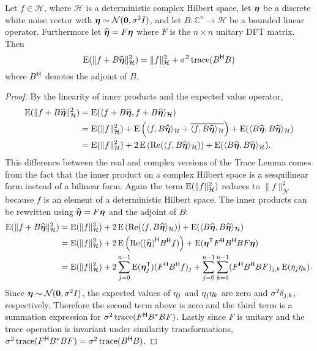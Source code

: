 \begin{lemma}
Let $f \in \mathcal{H}$, where $\mathcal{H}$ is a deterministic complex Hilbert space, let $\boldsymbol{\eta}$ be a discrete white noise vector with $\boldsymbol{\eta} \sim \mathcal{N}(\mathbf{0},\sigma^2{I})$, and let $B: \mathbb{C}^n \rightarrow  \mathcal{H}$ be a bounded linear operator. Furthermore let $\widehat{\boldsymbol{\eta}} = F\boldsymbol{\eta}$ where $F$ is the $n \times n$ unitary DFT matrix. Then
\[\operatorname{E}(\|f + B\widehat{\boldsymbol{\eta}}\|_{\mathcal{H}}^2) = \|f\|_{\mathcal{H}}^2 + \sigma^2\operatorname{trace}({B}^\mathsf{H}{B})\]
where ${B}^\mathsf{H}$ denotes the adjoint of $B$.
\end{lemma}
\begin{proof}
By the linearity of inner products and the expected value operator,
\begin{align*}
\operatorname{E}(\|f + B\widehat{\boldsymbol{\eta}}\|_{\mathcal{H}}^2) &= \operatorname{E}(\langle f + B\widehat{\boldsymbol{\eta}}, f + B\widehat{\boldsymbol{\eta}}\rangle_{\mathcal{H}}) \\
&= \operatorname{E}(\|f\|_{\mathcal{H}}^2) + \operatorname{E}\left(\langle f, B\widehat{\boldsymbol{\eta}}\rangle_{\mathcal{H}} + \overline{\langle f, B\widehat{\boldsymbol{\eta}}\rangle_{\mathcal{H}}}\right) + \operatorname{E}(\langle B\widehat{\boldsymbol{\eta}}, B\widehat{\boldsymbol{\eta}}\rangle_{\mathcal{H}}) \\
&= \operatorname{E}(\|f\|_{\mathcal{H}}^2) + 2\operatorname{E}\left(\operatorname{Re}(\langle f, B\widehat{\boldsymbol{\eta}}\rangle_{\mathcal{H}})\right) + \operatorname{E}(\langle B\widehat{\boldsymbol{\eta}}, B\widehat{\boldsymbol{\eta}}\rangle_{\mathcal{H}}).
\end{align*}
This difference between the real and complex versions of the Trace Lemma comes from the fact that the inner product on a complex Hilbert space is a sesquilinear form instead of a bilinear form. Again the term $\operatorname{E}(\|f\|_{\mathcal{H}}^2)$ reduces to $\|f\|_{\mathcal{H}}^2$ because $f$ is an element of a deterministic Hilbert space. The inner products can be rewritten using $\widehat{\boldsymbol{\eta}} = F\boldsymbol{\eta}$ and the adjoint of $B$:
\begin{align*}
\operatorname{E}(\|f + B\widehat{\boldsymbol{\eta}}\|_{\mathcal{H}}^2) &= \operatorname{E}(\|f\|_{\mathcal{H}}^2) + 2\operatorname{E}\left(\operatorname{Re}(\langle f, B\widehat{\boldsymbol{\eta}}\rangle_{\mathcal{H}})\right) + \operatorname{E}(\langle B\widehat{\boldsymbol{\eta}}, B\widehat{\boldsymbol{\eta}}\rangle_{\mathcal{H}}) \\
&= \operatorname{E}(\|f\|_{\mathcal{H}}^2) + 2\operatorname{E}\left(\operatorname{Re}({(\widehat{\boldsymbol{\eta}})}^\mathsf{H}{{B}^\mathsf{H}}f)\right) + \operatorname{E}({\boldsymbol{\eta}}^\mathsf{T}{{F}^\mathsf{H}}{{B}^\mathsf{H}}BF\boldsymbol{\eta}) \\
&= \operatorname{E}(\|f\|_{\mathcal{H}}^2) + 2\sum_{j=0}^{n-1} \operatorname{E}({\boldsymbol{\eta}}^\mathsf{T}_j)({F}^\mathsf{H}{{B}^\mathsf{H}}f)_j + \sum_{j=0}^{n-1}\sum_{k=0}^{n-1} ({{F}^\mathsf{H}}{{B}^\mathsf{H}}BF)_{j,k}\operatorname{E}(\eta_j\eta_k).
\end{align*}
Since $\boldsymbol{\eta} \sim \mathcal{N}(\mathbf{0},\sigma^2{I})$, the expected values of $\eta_j$ and ${\eta_j}{\eta_k}$ are zero and $\sigma^2\delta_{j,k}$, respectively. Therefore the second term above is zero and the third term is a summation expression for $\sigma^2\operatorname{trace}({F}^\mathsf{H}{B^*}BF)$. Lastly since $F$ is unitary and the trace operation is invariant under similarity transformations, $\sigma^2\operatorname{trace}({F}^\mathsf{H}{B^*}BF) = \sigma^2\operatorname{trace}({B}^\mathsf{H}{B})$.
\end{proof}


